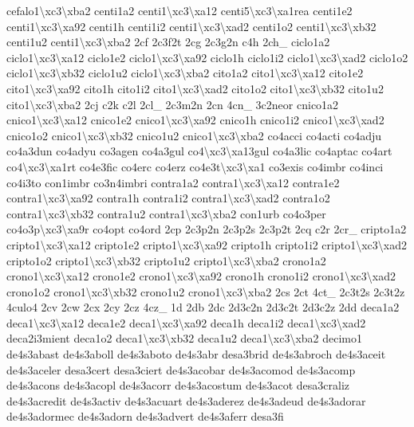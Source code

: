 {cefalo1\textbackslash{}xc3\textbackslash{}xba2 centi1a2 centi1\textbackslash{}xc3\textbackslash{}xa12 centi5\textbackslash{}xc3\textbackslash{}xa1rea centi1e2 centi1\textbackslash{}xc3\textbackslash{}xa92 centi1h centi1i2 centi1\textbackslash{}xc3\textbackslash{}xad2 centi1o2 centi1\textbackslash{}xc3\textbackslash{}xb32 centi1u2 centi1\textbackslash{}xc3\textbackslash{}xba2 2cf 2c3f2t 2cg 2c3g2n c4h 2ch\-\_\- ciclo1a2 ciclo1\textbackslash{}xc3\textbackslash{}xa12 ciclo1e2 ciclo1\textbackslash{}xc3\textbackslash{}xa92 ciclo1h ciclo1i2 ciclo1\textbackslash{}xc3\textbackslash{}xad2 ciclo1o2 ciclo1\textbackslash{}xc3\textbackslash{}xb32 ciclo1u2 ciclo1\textbackslash{}xc3\textbackslash{}xba2 cito1a2 cito1\textbackslash{}xc3\textbackslash{}xa12 cito1e2 cito1\textbackslash{}xc3\textbackslash{}xa92 cito1h cito1i2 cito1\textbackslash{}xc3\textbackslash{}xad2 cito1o2 cito1\textbackslash{}xc3\textbackslash{}xb32 cito1u2 cito1\textbackslash{}xc3\textbackslash{}xba2 2cj c2k c2l 2cl\-\_\- 2cm 2c3m2n 2cn 4cn\-\_\- 3c2neor cnico1a2 cnico1\textbackslash{}xc3\textbackslash{}xa12 cnico1e2 cnico1\textbackslash{}xc3\textbackslash{}xa92 cnico1h cnico1i2 cnico1\textbackslash{}xc3\textbackslash{}xad2 cnico1o2 cnico1\textbackslash{}xc3\textbackslash{}xb32 cnico1u2 cnico1\textbackslash{}xc3\textbackslash{}xba2 co4acci co4acti co4adju co4a3dun co4adyu co3agen co4a3gul co4\textbackslash{}xc3\textbackslash{}xa13gul co4a3lic co4aptac co4art co4\textbackslash{}xc3\textbackslash{}xa1rt co4e3fic co4erc co4erz co4e3t\textbackslash{}xc3\textbackslash{}xa1 co3exis co4imbr co4inci co4i3to con1imbr co3n4imbri contra1a2 contra1\textbackslash{}xc3\textbackslash{}xa12 contra1e2 contra1\textbackslash{}xc3\textbackslash{}xa92 contra1h contra1i2 contra1\textbackslash{}xc3\textbackslash{}xad2 contra1o2 contra1\textbackslash{}xc3\textbackslash{}xb32 contra1u2 contra1\textbackslash{}xc3\textbackslash{}xba2 con1urb co4o3per co4o3p\textbackslash{}xc3\textbackslash{}xa9r co4opt co4ord 2cp 2c3p2n 2c3p2s 2c3p2t 2cq c2r 2cr\-\_\- cripto1a2 cripto1\textbackslash{}xc3\textbackslash{}xa12 cripto1e2 cripto1\textbackslash{}xc3\textbackslash{}xa92 cripto1h cripto1i2 cripto1\textbackslash{}xc3\textbackslash{}xad2 cripto1o2 cripto1\textbackslash{}xc3\textbackslash{}xb32 cripto1u2 cripto1\textbackslash{}xc3\textbackslash{}xba2 crono1a2 crono1\textbackslash{}xc3\textbackslash{}xa12 crono1e2 crono1\textbackslash{}xc3\textbackslash{}xa92 crono1h crono1i2 crono1\textbackslash{}xc3\textbackslash{}xad2 crono1o2 crono1\textbackslash{}xc3\textbackslash{}xb32 crono1u2 crono1\textbackslash{}xc3\textbackslash{}xba2 2cs 2ct 4ct\-\_\- 2c3t2s 2c3t2z 4culo4 2cv 2cw 2cx 2cy 2cz 4cz\-\_\- 1d 2db 2dc 2d3c2n 2d3c2t 2d3c2z 2dd deca1a2 deca1\textbackslash{}xc3\textbackslash{}xa12 deca1e2 deca1\textbackslash{}xc3\textbackslash{}xa92 deca1h deca1i2 deca1\textbackslash{}xc3\textbackslash{}xad2 deca2i3mient deca1o2 deca1\textbackslash{}xc3\textbackslash{}xb32 deca1u2 deca1\textbackslash{}xc3\textbackslash{}xba2 decimo1 de4s3abast de4s3aboll de4s3aboto de4s3abr desa3brid de4s3abroch de4s3aceit de4s3aceler desa3cert desa3ciert de4s3acobar de4s3acomod de4s3acomp de4s3acons de4s3acopl de4s3acorr de4s3acostum de4s3acot desa3craliz de4s3acredit de4s3activ de4s3acuart de4s3aderez de4s3adeud de4s3adorar de4s3adormec de4s3adorn de4s3advert de4s3aferr desa3fi }
